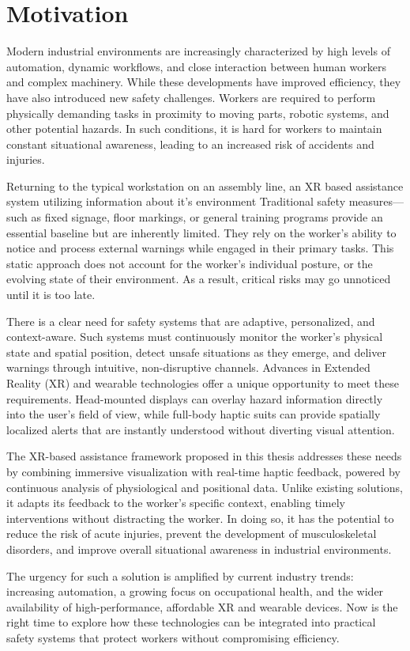 \chapter{Motivation}
\label{chap:motivation}
Modern industrial environments are increasingly characterized by high levels of automation, dynamic workflows, and close interaction between human workers and complex machinery. While these developments have improved efficiency, they have also introduced new safety challenges. Workers are required to perform physically demanding tasks in proximity to moving parts, robotic systems, and other potential hazards. In such conditions, it is hard for workers to maintain constant situational awareness, leading to an increased risk of accidents and injuries.

Returning to the typical workstation on an assembly line, an XR based assistance system utilizing information about it's environment  
Traditional safety measures—such as fixed signage, floor markings, or general training programs provide an essential baseline but are inherently limited. They rely on the worker’s ability to notice and process external warnings while engaged in their primary tasks. This static approach does not account for the worker’s individual posture, or the evolving state of their environment. As a result, critical risks may go unnoticed until it is too late.

There is a clear need for safety systems that are adaptive, personalized, and context-aware. Such systems must continuously monitor the worker’s physical state and spatial position, detect unsafe situations as they emerge, and deliver warnings through intuitive, non-disruptive channels. Advances in Extended Reality (XR) and wearable technologies offer a unique opportunity to meet these requirements. Head-mounted displays can overlay hazard information directly into the user’s field of view, while full-body haptic suits can provide spatially localized alerts that are instantly understood without diverting visual attention.

The XR-based assistance framework proposed in this thesis addresses these needs by combining immersive visualization with real-time haptic feedback, powered by continuous analysis of physiological and positional data. Unlike existing solutions, it adapts its feedback to the worker’s specific context, enabling timely interventions without distracting the worker. In doing so, it has the potential to reduce the risk of acute injuries, prevent the development of musculoskeletal disorders, and improve overall situational awareness in industrial environments.

The urgency for such a solution is amplified by current industry trends: increasing automation, a growing focus on occupational health, and the wider availability of high-performance, affordable XR and wearable devices. Now is the right time to explore how these technologies can be integrated into practical safety systems that protect workers without compromising efficiency.
